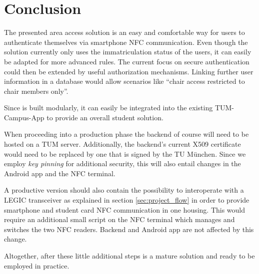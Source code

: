 \section{Conclusion}\label{sec:conclusion}

The presented area access solution is an easy and comfortable way for users to authenticate themselves via smartphone NFC communication.
Even though the \app solution currently only uses the immatriculation status of the users, it can easily be adapted for more advanced rules.
The current focus on secure authentication could then be extended by useful authorization mechanisms.
Linking further user information in a database would allow scenarios like ``chair access restricted to chair members only''.

Since \app is built modularly, it can easily be integrated into the existing TUM-Campus-App to provide an overall student solution.

When proceeding into a production phase the backend of course will need to be hosted on a TUM server.
Additionally, the backend's current X509 certificate would need to be replaced by one that is signed by the TU München.
Since we employ \textit{key pinning} for additional security, this will also entail changes in the Android app and the NFC terminal.

A productive version should also contain the possibility to interoperate with a LEGIC transceiver as explained in section \ref{sec:project_flow} in order to provide smartphone and student card NFC communication in one housing.
This would require an additional small script on the NFC terminal which manages and switches the two NFC readers.
Backend and Android app are not affected by this change.

Altogether, after these little additional steps \app is a mature solution and ready to be employed in practice.


\iffalse
Outlook?

- Die Lösung im Zusammenspiel mit dem Legic-Zeugs beschreiben. Das mit zwischen den zwei Readern hin- und herschalten.
Wobei Teile dieser Problembeschreibung schon ins Kapitel ``project flow'' müssen.

- Was man in der Praxis machen müsste: halbfertige Registrierungen (Token nicht aktiviert) nach einiger Zeit wieder aus dem Backend löschen. Sonst könnte jemand das Backend total zumüllen. DoS-mäßig...

- (eventuell) Man müsste IP-Adressen von requests im backend loggen. Sonst könnte man mittels Backend als Proxy TUMOnline spammen.

\fi